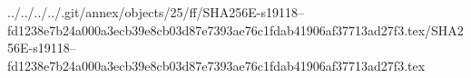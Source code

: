 ../../../../.git/annex/objects/25/ff/SHA256E-s19118--fd1238e7b24a000a3ecb39e8cb03d87e7393ae76c1fdab41906af37713ad27f3.tex/SHA256E-s19118--fd1238e7b24a000a3ecb39e8cb03d87e7393ae76c1fdab41906af37713ad27f3.tex